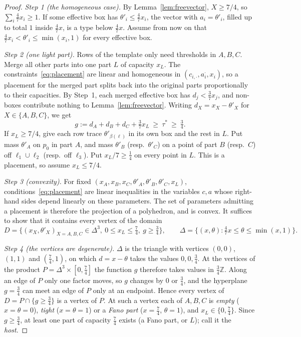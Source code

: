 \begin{proof}
\emph{Step 1 (the homogeneous case).} By Lemma~\ref{lem:freevector}, $X\ge7/4$, so $\sum_i\frac47x_i\ge1$. If some effective box has $\theta'_i\le\frac47x_i$, the vector with $a_i=\theta'_i$, filled up to total $1$ inside $\frac47x$, is a type below $\frac47x$. Assume from now on that $\frac47x_i<\theta'_i\le\min(x_i,1)$ for every effective box.

\emph{Step 2 (one light part).} Rows of the template only need thresholds in $A,B,C$. Merge all other parts into one part $L$ of capacity $x_L$. The constraints~\eqref{eq:placement} are linear and homogeneous in $(c_{i,\cdot},a_{i}^{\cdot},x_i)$, so a placement for the merged part splits back into the original parts proportionally to their capacities. By Step~1, each merged effective box has $d_j<\frac37x_j$, and non-boxes contribute nothing to Lemma~\ref{lem:freevector}. Writing $d_X=x_X-\theta'_X$ for $X\in\{A,B,C\}$, we get
\begin{equation}\label{eq:g}
g:=d_A+d_B+d_C+\tfrac37x_L\ \ge\ \tau^*\ \ge\ \tfrac34 .
\end{equation}
If $x_L\ge7/4$, give each row trace $\theta'_{\beta(\ell)}$ in its own box and the rest in $L$. Put mass $\theta'_A$ on $p_0$ in part $A$, and mass $\theta'_B$ (resp.\ $\theta'_C$) on a point of part $B$ (resp.\ $C$) off $\ell_1\cup\ell_2$ (resp.\ off $\ell_3$). Put $x_L/7\ge\frac14$ on every point in $L$. This is a placement, so assume $x_L\le7/4$.

\emph{Step 3 (convexity).} For fixed $(x_A,x_B,x_C,\theta'_A,\theta'_B,\theta'_C,x_L)$, conditions~\eqref{eq:placement} are linear inequalities in the variables $c,a$ whose right-hand sides depend linearly on these parameters. The set of parameters admitting a placement is therefore the projection of a polyhedron, and is convex. It suffices to show that it contains every vertex of the domain
\[
D=\{(x_X,\theta'_X)_{X=A,B,C}\in\Delta^3,\ 0\le x_L\le\tfrac74,\ g\ge\tfrac34\},\qquad
\Delta=\{(x,\theta):\tfrac47x\le\theta\le\min(x,1)\}.
\]

\emph{Step 4 (the vertices are degenerate).} $\Delta$ is the triangle with vertices $(0,0)$, $(1,1)$ and $(\frac74,1)$, on which $d=x-\theta$ takes the values $0,0,\frac34$. At the vertices of the product $P=\Delta^3\times[0,\frac74]$ the function $g$ therefore takes values in $\frac34\mathbb Z$. Along an edge of $P$ only one factor moves, so $g$ changes by $0$ or $\frac34$, and the hyperplane $g=\frac34$ can meet an edge of $P$ only at an endpoint. Hence every vertex of $D=P\cap\{g\ge\frac34\}$ is a vertex of $P$. At such a vertex each of $A,B,C$ is \emph{empty} ($x=\theta=0$), \emph{tight} ($x=\theta=1$) or a \emph{Fano part} ($x=\frac74$, $\theta=1$), and $x_L\in\{0,\frac74\}$. Since $g\ge\frac34$, at least one part of capacity $\frac74$ exists (a Fano part, or $L$); call it the \emph{host}.


\end{proof}
